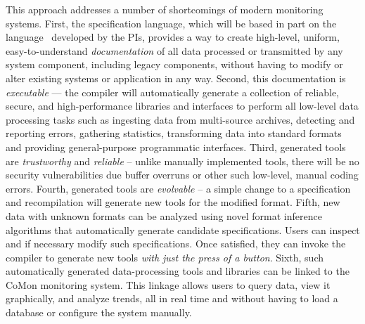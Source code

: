 This approach addresses a number of shortcomings of modern monitoring
systems.  First, the specification language, which will be based
in part on the \pads{} language~\cite{fisher+:pads,fisher+:popl06,mandelbaum+:pads-ml} developed by the PIs,  provides a 
way to create high-level, uniform, easy-to-understand {\em documentation}
of all data processed or transmitted by any system component, 
including legacy components, without having to modify or alter existing
systems or
application in any way.  Second, this documentation is 
{\em executable} --- the compiler will automatically generate a collection of
reliable, secure, and high-performance libraries and interfaces
to perform all low-level data processing tasks such as ingesting
data from multi-source archives, detecting and reporting
errors, gathering statistics, 
transforming data into standard formats and providing
general-purpose programmatic interfaces.  Third, generated
tools are {\em trustworthy} and {\em reliable} -- unlike manually 
implemented tools, there will be no security vulnerabilities due
buffer overruns or other such low-level, manual coding errors.
Fourth, generated tools are {\em evolvable} -- a simple change to
a specification and recompilation will generate new tools for
the modified format.  Fifth, new data with unknown formats can be analyzed
using novel format inference algorithms that automatically generate
candidate specifications.  Users can inspect and if necessary modify
such specifications. Once satisfied, they can invoke the \pads{}
compiler to generate new tools {\em with just the press of a button}.
Sixth, such automatically generated data-processing tools and libraries 
can be linked to the CoMon monitoring
system.  This linkage allows users to query
data, view it graphically, and analyze trends, all in real
time and without having to load a database or configure the system manually.



